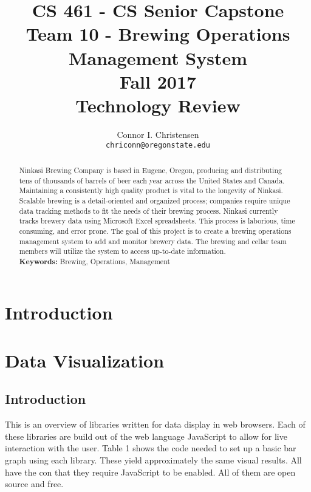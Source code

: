 \documentclass[draftclsnofoot,onecolumn,letterpaper,10pt,compsoc]{IEEEtran}
\title{CS 461 - CS Senior Capstone
  \\Team 10 - Brewing Operations Management System
	\\Fall 2017
	\\Technology Review
}
\author{
	Connor I. Christensen \\
	\texttt{chriconn@oregonstate.edu}
}
\begin{document}
\begin{titlingpage}
    \maketitle
    \begin{abstract}
      Ninkasi Brewing Company is based in Eugene, Oregon, producing and distributing tens of thousands of barrels of beer each year across the United States and Canada.
      Maintaining a consistently high quality product is vital to the longevity of Ninkasi.
      Scalable brewing is a detail-oriented and organized process; companies require unique data tracking methods to fit the needs of their brewing process.
      Ninkasi currently tracks brewery data using Microsoft Excel spreadsheets.
      This process is laborious, time consuming, and error prone.
      The goal of this project is to create a brewing operations management system to add and monitor brewery data.
      The brewing and cellar team members will utilize the system to access up-to-date information.
      \\
      \textbf{Keywords:} Brewing, Operations, Management
    \end{abstract}
		\pagebreak
		\tableofcontents
\end{titlingpage}

\section{Introduction}


\section{Data Visualization}
  \subsection{Introduction}
  This is an overview of libraries written for data display in web browsers.
  Each of these libraries are build out of the web language JavaScript to allow for live interaction with the user.
  Table 1 shows the code needed to set up a basic bar graph using each library.
  These yield approximately the same visual results.
  All have the con that they require JavaScript to be enabled.
  All of them are open source and free.
\end{document}
